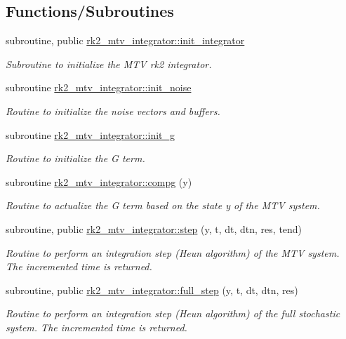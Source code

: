\subsection*{Functions/\+Subroutines}
\begin{DoxyCompactItemize}
\item 
subroutine, public \hyperlink{namespacerk2__mtv__integrator_ac898de547481bd9af9cf76abf7972b3a}{rk2\+\_\+mtv\+\_\+integrator\+::init\+\_\+integrator}
\begin{DoxyCompactList}\small\item\em Subroutine to initialize the M\+TV rk2 integrator. \end{DoxyCompactList}\item 
subroutine \hyperlink{namespacerk2__mtv__integrator_a2e6d01c401a4baf9ae1a5046793ca4f9}{rk2\+\_\+mtv\+\_\+integrator\+::init\+\_\+noise}
\begin{DoxyCompactList}\small\item\em Routine to initialize the noise vectors and buffers. \end{DoxyCompactList}\item 
subroutine \hyperlink{namespacerk2__mtv__integrator_a6f4eeef9bfd2b9097251da6c7e17cc24}{rk2\+\_\+mtv\+\_\+integrator\+::init\+\_\+g}
\begin{DoxyCompactList}\small\item\em Routine to initialize the G term. \end{DoxyCompactList}\item 
subroutine \hyperlink{namespacerk2__mtv__integrator_aad1f3a82362ff6e64d0e5587d285bbde}{rk2\+\_\+mtv\+\_\+integrator\+::compg} (y)
\begin{DoxyCompactList}\small\item\em Routine to actualize the G term based on the state y of the M\+TV system. \end{DoxyCompactList}\item 
subroutine, public \hyperlink{namespacerk2__mtv__integrator_ad2806f20979d8c2cda13367addb63b3b}{rk2\+\_\+mtv\+\_\+integrator\+::step} (y, t, dt, dtn, res, tend)
\begin{DoxyCompactList}\small\item\em Routine to perform an integration step (Heun algorithm) of the M\+TV system. The incremented time is returned. \end{DoxyCompactList}\item 
subroutine, public \hyperlink{namespacerk2__mtv__integrator_a6f7d6995f02f84e6967e1ae169c38014}{rk2\+\_\+mtv\+\_\+integrator\+::full\+\_\+step} (y, t, dt, dtn, res)
\begin{DoxyCompactList}\small\item\em Routine to perform an integration step (Heun algorithm) of the full stochastic system. The incremented time is returned. \end{DoxyCompactList}\end{DoxyCompactItemize}
